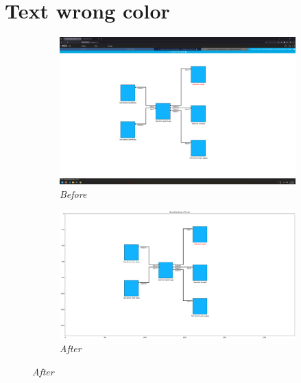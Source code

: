 \documentclass{article}
\begin{document}
\section{Text wrong color}
\begin{figure}[H]
    \centering
    \begin{subfigure}[t]{0.9\textwidth}
        \centering
        \includegraphics[width=\textwidth]{testcases/text_wrong_color/155122-094397_input_image.png}
        \caption*{\textit{Before}}
    \end{subfigure}
    \newline
    \begin{subfigure}[t]{0.9\textwidth}
        \centering
        \includegraphics[width=\textwidth]{testcases/text_wrong_color/155134-981060_element_bbox_errors_labeled_colored.png}
        \caption*{\textit{After}}
    \end{subfigure}
    \label{fig:text_wrong_color}
\end{figure}
\newpage
\end{document}
